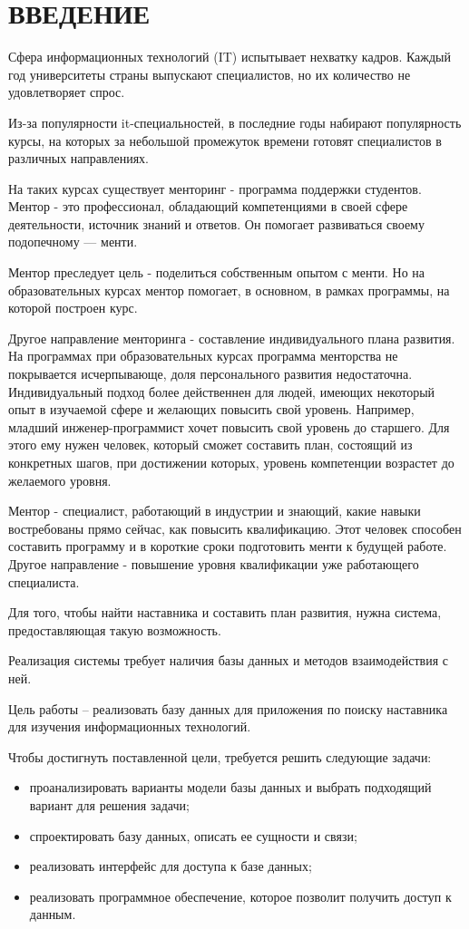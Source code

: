 \chapter*{ВВЕДЕНИЕ}

Сфера информационных технологий (IT) испытывает нехватку кадров. Каждый год университеты страны выпускают специалистов, но их
количество не удовлетворяет спрос.

Из-за популярности it-специальностей, в последние годы набирают популярность курсы, на которых за небольшой промежуток времени
готовят специалистов в различных направлениях.

На таких курсах существует менторинг - программа поддержки студентов. Ментор - это профессионал, обладающий компетенциями в своей сфере деятельности, источник знаний и ответов. Он помогает развиваться своему подопечному — менти. 

Ментор преследует цель - поделиться собственным опытом с менти. Но на образовательных курсах ментор помогает, в основном, в рамках программы, на которой построен курс. 

Другое направление менторинга - составление индивидуального плана развития.
На программах при образовательных курсах программа менторства не покрывается исчерпывающе, доля персонального развития недостаточна.
Индивидуальный подход более действеннен для людей, имеющих некоторый опыт в изучаемой сфере и желающих повысить свой уровень. Например, младший инженер-программист хочет повысить свой уровень до старшего. Для этого ему нужен человек, который сможет составить план, состоящий из конкретных шагов, при достижении которых, уровень компетенции возрастет до желаемого уровня.  

Ментор - специалист, работающий в индустрии и знающий, какие навыки востребованы прямо сейчас, как повысить квалификацию.
Этот человек способен составить программу и в короткие сроки подготовить менти к будущей работе. Другое направление - повышение уровня квалификации уже работающего специалиста.

Для того, чтобы найти наставника и составить план развития, нужна система, предоставляющая такую возможность. 

Реализация системы требует наличия базы данных и методов взаимодействия с ней.

Цель работы -- реализовать базу данных для приложения по поиску наставника для изучения информационных технологий.

Чтобы достигнуть поставленной цели, требуется решить следующие задачи:

\begin{itemize}
    \item проанализировать варианты модели базы данных и выбрать подходящий вариант для решения задачи;
    \item спроектировать базу данных, описать ее сущности и связи;
    \item реализовать интерфейс для доступа к базе данных;
    \item реализовать программное обеспечение, которое позволит получить доступ к данным.
\end{itemize}